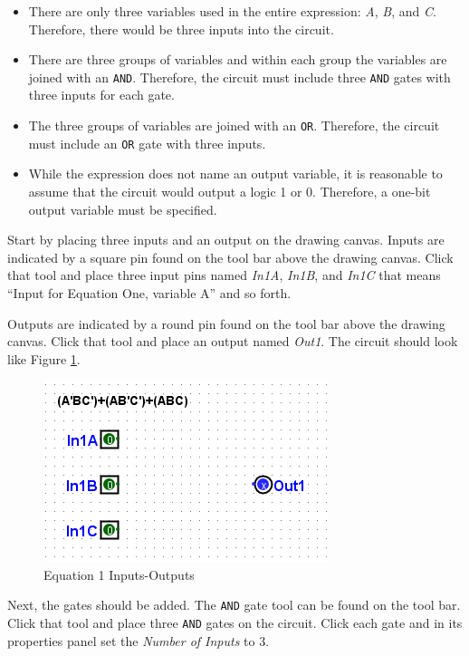 \begin{itemize}
	\item There are only three variables used in the entire expression: \textit{A}, \textit{B}, and \textit{C}. Therefore, there would be three inputs into the circuit.
	\item There are three groups of variables and within each group the variables are joined with an \texttt{AND}. Therefore, the circuit must include three \texttt{AND} gates with three inputs for each gate.
	\item The three groups of variables are joined with an \texttt{OR}. Therefore, the circuit must include an \texttt{OR} gate with three inputs.
	\item While the expression does not name an output variable, it is reasonable to assume that the circuit would output a logic 1 or 0. Therefore, a one-bit output variable must be specified.
\end{itemize}

Start by placing three inputs and an output on the drawing canvas. Inputs are indicated by a square pin found on the tool bar above the drawing canvas. Click that tool and place three input pins named \textit{In1A}, \textit{In1B}, and \textit{In1C} \textemdash that means ``Input for Equation One, variable A'' and so forth. 

Outputs are indicated by a round pin found on the tool bar above the drawing canvas. Click that tool and place an output named \textit{Out1}. The circuit should look like Figure \ref{fig:02-01}.

\begin{figure}[H]
	\centering
	\includegraphics[width=\maxwidth{.95\linewidth}]{gfx/02-01}
	\caption{Equation 1 Inputs-Outputs}
	\label{fig:02-01}
\end{figure}

Next, the gates should be added. The \texttt{AND} gate tool can be found on the tool bar. Click that tool and place three \texttt{AND} gates on the circuit. Click each gate and in its properties panel set the \textit{Number of Inputs} to 3. 

